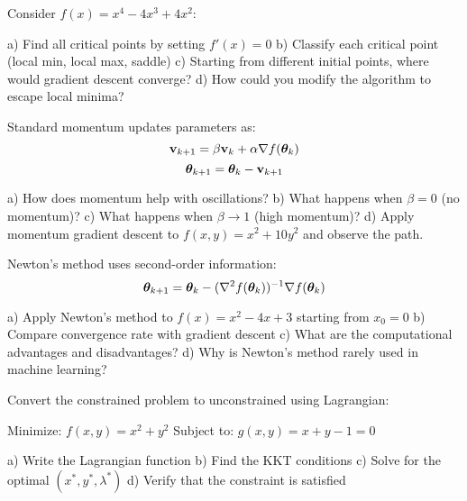 \documentclass{article}
\newcounter{exercise}
\begin{document}
\begin{tcolorbox}[colback=gray!5!white,colframe=gray!75!black,title=Problem \stepcounter{exercise}: Local vs Global Minima]

Consider $f(x) = x^4 - 4x^3 + 4x^2$:

a) Find all critical points by setting $f'(x) = 0$
b) Classify each critical point (local min, local max, saddle)
c) Starting from different initial points, where would gradient descent converge?
d) How could you modify the algorithm to escape local minima?
\end{tcolorbox}

\begin{tcolorbox}[colback=gray!5!white,colframe=gray!75!black,title=Problem \stepcounter{exercise}: Momentum Methods]

Standard momentum updates parameters as:
$$\mathbf{v}_{k+1} = \beta \mathbf{v}_k + \alpha \nabla f(\boldsymbol{\theta}_k)$$
$$\boldsymbol{\theta}_{k+1} = \boldsymbol{\theta}_k - \mathbf{v}_{k+1}$$

a) How does momentum help with oscillations?
b) What happens when $\beta = 0$ (no momentum)?
c) What happens when $\beta \to 1$ (high momentum)?
d) Apply momentum gradient descent to $f(x, y) = x^2 + 10y^2$ and observe the path.
\end{tcolorbox}

\begin{tcolorbox}[colback=gray!5!white,colframe=gray!75!black,title=Problem \stepcounter{exercise}: Newton's Method]

Newton's method uses second-order information:
$$\boldsymbol{\theta}_{k+1} = \boldsymbol{\theta}_k - (\nabla^2 f(\boldsymbol{\theta}_k))^{-1} \nabla f(\boldsymbol{\theta}_k)$$

a) Apply Newton's method to $f(x) = x^2 - 4x + 3$ starting from $x_0 = 0$
b) Compare convergence rate with gradient descent
c) What are the computational advantages and disadvantages?
d) Why is Newton's method rarely used in machine learning?
\end{tcolorbox}

\begin{tcolorbox}[colback=gray!5!white,colframe=gray!75!black,title=Problem \stepcounter{exercise}: Constrained Optimization Setup]

Convert the constrained problem to unconstrained using Lagrangian:

Minimize: $f(x, y) = x^2 + y^2$
Subject to: $g(x, y) = x + y - 1 = 0$

a) Write the Lagrangian function
b) Find the KKT conditions  
c) Solve for the optimal $(x^*, y^*, \lambda^*)$
d) Verify that the constraint is satisfied
\end{tcolorbox}
\end{document}
